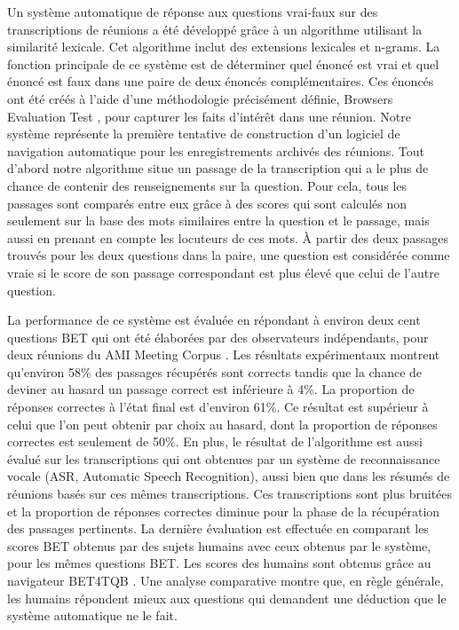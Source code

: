 Un syst\`eme automatique de r\'eponse aux questions vrai-faux sur des transcriptions de r\'eunions a \'et\'e d\'evelopp\'e gr\^ace \`a un algorithme utilisant la similarit\'e lexicale. Cet algorithme inclut des extensions lexicales et n-grams. La fonction principale de ce syst\`eme est de d\'eterminer quel \'enonc\'e est vrai et quel \'enonc\'e est faux dans une paire de deux \'enonc\'es compl\'ementaires. Ces \'enonc\'es ont \'et\'e cr\'e\'es \`a l'aide d'une m\'ethodologie pr\'ecis\'ement d\'efinie, Browsers Evaluation Test \cite{BET}, pour capturer les faits d'int\'er\^et dans une r\'eunion. Notre syst\`eme repr\'esente la premi\`ere tentative de construction d'un logiciel de navigation automatique pour les enregistrements archiv\'es des r\'eunions.
Tout d'abord notre algorithme situe un passage de la transcription qui a le plus de chance de contenir des renseignements sur la question. Pour cela, tous les passages sont compar\'es entre eux gr\^ace \`a des scores qui sont calcul\'es non seulement sur la base des mots similaires entre la question et le passage, mais aussi en prenant en compte les locuteurs de ces mots. \`A partir des deux passages trouv\'es pour les deux questions dans la paire, une question est consid\'er\'ee comme vraie si le score de son passage correspondant est plus \'elev\'e que celui de l'autre question.

La performance de ce syst\`eme est \'evalu\'ee en r\'epondant \`a environ deux cent questions BET qui ont \'et\'e \'elabor\'ees par des observateurs ind\'ependants, pour deux r\'eunions du AMI Meeting Corpus \cite{AMI_corpus}. Les r\'esultats exp\'erimentaux montrent qu'environ 58\% des passages r\'ecup\'er\'es sont corrects tandis que la chance de deviner au hasard un passage correct est inf\'erieure \`a 4\%. La proportion de r\'eponses correctes \`a l'\'etat final est d'environ 61\%. Ce r\'esultat est sup\'erieur \`a celui que l'on peut obtenir par choix au hasard, dont la proportion de r\'eponses correctes est seulement de 50\%. En plus, le r\'esultat de l'algorithme est aussi \'evalu\'e sur les transcriptions qui ont obtenues par un syst\`eme de reconnaissance vocale (ASR, Automatic Speech Recognition), aussi bien que dans les r\'esum\'es de r\'eunions bas\'es sur ces m\^emes transcriptions. Ces transcriptions sont plus bruit\'ees et la proportion de r\'eponses correctes diminue pour la phase de la r\'ecup\'eration des passages pertinents. La derni\`ere \'evaluation est effectu\'ee en comparant les scores BET obtenus par des sujets humains avec ceux obtenus par le syst\`eme, pour les m\^emes questions BET. Les scores des humains sont obtenus gr\^ace au navigateur BET4TQB \cite{popescubelis2007otm}. Une analyse comparative montre que, en r\`egle g\'en\'erale, les humains r\'epondent mieux aux questions qui demandent une d\'eduction que le syst\`eme automatique ne le fait.


